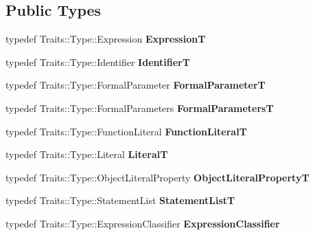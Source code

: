 \subsection*{Public Types}
\begin{DoxyCompactItemize}
\item 
typedef Traits\+::\+Type\+::\+Expression {\bfseries ExpressionT}\hypertarget{classv8_1_1internal_1_1_parser_base_a8ed9bb712dc6a4b175ae296f947fd483}{}\label{classv8_1_1internal_1_1_parser_base_a8ed9bb712dc6a4b175ae296f947fd483}

\item 
typedef Traits\+::\+Type\+::\+Identifier {\bfseries IdentifierT}\hypertarget{classv8_1_1internal_1_1_parser_base_aba058e9e9fff437ea93b20854533d766}{}\label{classv8_1_1internal_1_1_parser_base_aba058e9e9fff437ea93b20854533d766}

\item 
typedef Traits\+::\+Type\+::\+Formal\+Parameter {\bfseries Formal\+ParameterT}\hypertarget{classv8_1_1internal_1_1_parser_base_a00470ae08e19b2730d1603c76d2d12ad}{}\label{classv8_1_1internal_1_1_parser_base_a00470ae08e19b2730d1603c76d2d12ad}

\item 
typedef Traits\+::\+Type\+::\+Formal\+Parameters {\bfseries Formal\+ParametersT}\hypertarget{classv8_1_1internal_1_1_parser_base_af5a07cfeea97bd30eec772acd45e4418}{}\label{classv8_1_1internal_1_1_parser_base_af5a07cfeea97bd30eec772acd45e4418}

\item 
typedef Traits\+::\+Type\+::\+Function\+Literal {\bfseries Function\+LiteralT}\hypertarget{classv8_1_1internal_1_1_parser_base_a67ea5acb7eff51938bd594ae43fa005e}{}\label{classv8_1_1internal_1_1_parser_base_a67ea5acb7eff51938bd594ae43fa005e}

\item 
typedef Traits\+::\+Type\+::\+Literal {\bfseries LiteralT}\hypertarget{classv8_1_1internal_1_1_parser_base_a56a774f2fe01e13c2a36b968584d496a}{}\label{classv8_1_1internal_1_1_parser_base_a56a774f2fe01e13c2a36b968584d496a}

\item 
typedef Traits\+::\+Type\+::\+Object\+Literal\+Property {\bfseries Object\+Literal\+PropertyT}\hypertarget{classv8_1_1internal_1_1_parser_base_a2ff6f79859df2accf526cc6f1db38fb0}{}\label{classv8_1_1internal_1_1_parser_base_a2ff6f79859df2accf526cc6f1db38fb0}

\item 
typedef Traits\+::\+Type\+::\+Statement\+List {\bfseries Statement\+ListT}\hypertarget{classv8_1_1internal_1_1_parser_base_a4f47d762fe5fb20c651240f1fd44af65}{}\label{classv8_1_1internal_1_1_parser_base_a4f47d762fe5fb20c651240f1fd44af65}

\item 
typedef Traits\+::\+Type\+::\+Expression\+Classifier {\bfseries Expression\+Classifier}\hypertarget{classv8_1_1internal_1_1_parser_base_a03fb1b1a44a86242a86dac650a8433e0}{}\label{classv8_1_1internal_1_1_parser_base_a03fb1b1a44a86242a86dac650a8433e0}

\end{DoxyCompactItemize}

